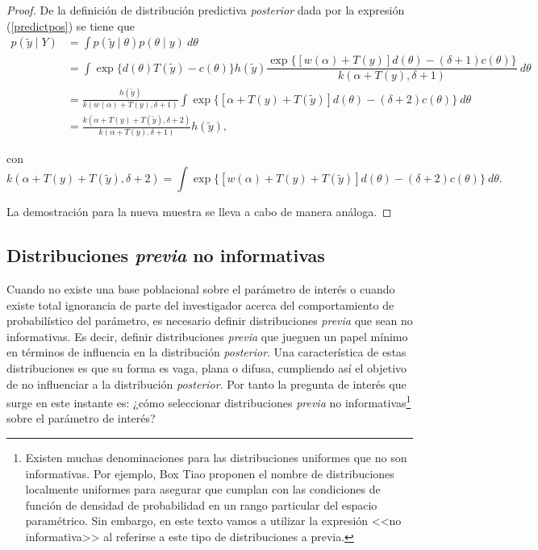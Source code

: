 \documentclass[10pt,openright]{book}\usepackage[]{graphicx}\usepackage[]{color}
\begin{document}
\begin{proof}
De la definición de distribución predictiva \emph{posterior} dada por la expresión (\ref{predictpos}) se tiene que
\begin{align*}
p(\tilde{y} \mid Y)&=\int p(\tilde{y} \mid \theta)p(\theta \mid y)\ d\theta\\
&=\int \exp\{d(\theta)T(\tilde{y})-c(\theta)\}h(\tilde{y})\dfrac{\exp\{[w(\alpha)+T(y)]d(\theta)-(\delta+1)c(\theta)\}}{k(\alpha+T(y),\delta+1)}\ d\theta\\
&=\frac{h(\tilde{y})}{k(w(\alpha)+T(y),\delta+1)}\int \exp\{[\alpha+T(y)+T(\tilde{y})]d(\theta)-(\delta+2)c(\theta)\}\ d\theta\\
&=\frac{k(\alpha+T(y)+T(\tilde{y}),\delta+2)}{k(\alpha+T(y),\delta+1)}h(\tilde{y}),
\end{align*}

con
\begin{equation*}
k(\alpha+T(y)+T(\tilde{y}),\delta+2)=\int \exp\{[w(\alpha)+T(y)+T(\tilde{y})]d(\theta)-(\delta+2)c(\theta)\}\ d\theta.
\end{equation*}

La demostración para la nueva muestra se lleva a cabo de manera análoga.
\end{proof}

\subsection{Distribuciones \emph{previa} no informativas}

Cuando no existe una base poblacional sobre el parámetro de interés o cuando existe total ignorancia de parte del investigador acerca del comportamiento de probabilístico del parámetro, es necesario definir distribuciones \emph{previa} que sean no informativas. Es decir, definir distribuciones \emph{previa} que jueguen un papel mínimo en términos de influencia en la distribución \emph{posterior}. Una característica de estas distribuciones es que su forma es vaga, plana o difusa, cumpliendo así el objetivo de no influenciar a la distribución \emph{posterior}. Por tanto la pregunta de interés que surge en este instante es: ¿cómo seleccionar distribuciones \emph{previa} no informativas\footnote{Existen muchas denominaciones para las distribuciones uniformes que no son informativas. Por ejemplo, Box Tiao proponen el nombre de distribuciones localmente uniformes para asegurar que cumplan con las condiciones de función de densidad de probabilidad en un rango particular del espacio paramétrico. Sin embargo, en este texto vamos a utilizar la expresión <<no informativa>> al referirse a este tipo de distribuciones a previa.} sobre el parámetro de interés?
\end{document}
